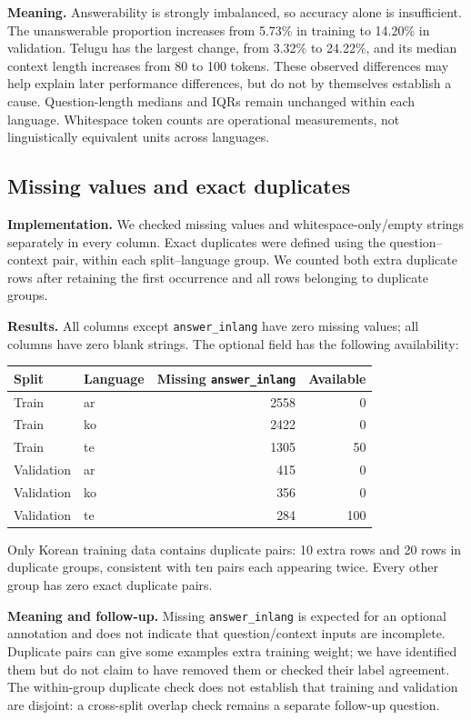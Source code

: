 \documentclass[11pt,a4paper]{article}
\begin{document}
\textbf{Meaning.} Answerability is strongly imbalanced, so accuracy alone is insufficient. The unanswerable proportion increases from 5.73\% in training to 14.20\% in validation. Telugu has the largest change, from 3.32\% to 24.22\%, and its median context length increases from 80 to 100 tokens. These observed differences may help explain later performance differences, but do not by themselves establish a cause. Question-length medians and IQRs remain unchanged within each language. Whitespace token counts are operational measurements, not linguistically equivalent units across languages.

\subsection{Missing values and exact duplicates}
\textbf{Implementation.} We checked missing values and whitespace-only/empty strings separately in every column. Exact duplicates were defined using the question--context pair, within each split--language group. We counted both extra duplicate rows after retaining the first occurrence and all rows belonging to duplicate groups.

\textbf{Results.} All columns except \texttt{answer\_inlang} have zero missing values; all columns have zero blank strings. The optional field has the following availability:

\begin{center}
\begin{tabular}{llrr}
\toprule
Split & Language & Missing \texttt{answer\_inlang} & Available \\
\midrule
Train & ar & 2558 & 0 \\
Train & ko & 2422 & 0 \\
Train & te & 1305 & 50 \\
Validation & ar & 415 & 0 \\
Validation & ko & 356 & 0 \\
Validation & te & 284 & 100 \\
\bottomrule
\end{tabular}
\end{center}

Only Korean training data contains duplicate pairs: 10 extra rows and 20 rows in duplicate groups, consistent with ten pairs each appearing twice. Every other group has zero exact duplicate pairs.

\textbf{Meaning and follow-up.} Missing \texttt{answer\_inlang} is expected for an optional annotation and does not indicate that question/context inputs are incomplete. Duplicate pairs can give some examples extra training weight; we have identified them but do not claim to have removed them or checked their label agreement. The within-group duplicate check does not establish that training and validation are disjoint: a cross-split overlap check remains a separate follow-up question.
\end{document}
